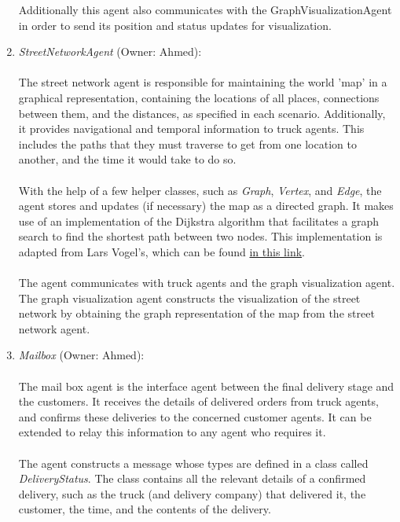 \documentclass[11pt, a4paper]{article}
\begin{document}
\begin{enumerate}
	Additionally this agent also communicates with the GraphVisualizationAgent in order to send its position and status updates for visualization. 
	\item \textit{StreetNetworkAgent} (Owner: Ahmed):
	\paragraph{}
	The street network agent is responsible for maintaining the world 'map' in a graphical representation, containing the locations of all places, connections between them, and the distances, as specified in each scenario. Additionally, it provides navigational and temporal information to truck agents. This includes the paths that they must traverse to get from one location to another, and the time it would take to do so.
	\paragraph{}
	With the help of a few helper classes, such as \textit{Graph}, \textit{Vertex}, and \textit{Edge}, the agent stores and updates (if necessary) the map as a directed graph. It makes use of an implementation of the Dijkstra algorithm that facilitates a graph search to find the shortest path between two nodes. This implementation is adapted from Lars Vogel's, which can be found \href{http://www.vogella.com/tutorials/JavaAlgorithmsDijkstra/article.html}{in this link}.
	\paragraph{}
	The agent communicates with truck agents and the graph visualization agent. The graph visualization agent constructs the visualization of the street network by obtaining the graph representation of the map from the street network agent.
	\item \textit{Mailbox} (Owner: Ahmed):
	\paragraph{}
	The mail box agent is the interface agent between the final delivery stage and the customers. It receives the details of delivered orders from truck agents, and confirms these deliveries to the concerned customer agents. It can be extended to relay this information to any agent who requires it.
	\paragraph{}
	The agent constructs a message whose types are defined in a class called \textit{DeliveryStatus}. The class contains all the relevant details of a confirmed delivery, such as the truck (and delivery company) that delivered it, the customer, the time, and the contents of the delivery.
	

\end{enumerate}
\end{document}

